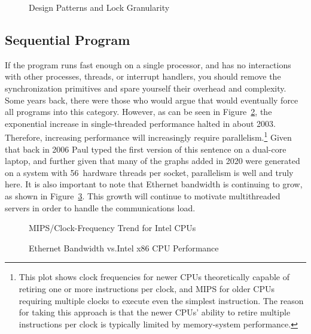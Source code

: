 \begin{figure}
\centering
{}
\caption{Design Patterns and Lock Granularity}
\label{fig:SMPdesign:Design Patterns and Lock Granularity}
\end{figure}

\subsection{Sequential Program}
\label{sec:SMPdesign:Sequential Program}

If the program runs fast enough on a single processor, and
has no interactions with other processes, threads, or interrupt
handlers, you should
remove the synchronization primitives and spare yourself their
overhead and complexity.
Some years back, there were those who would argue that 
would eventually force all programs into this category.
However, as can be seen in
Figure~\ref{fig:SMPdesign:Clock-Frequency Trend for Intel CPUs},
the exponential increase in single-threaded performance halted in
about 2003.
Therefore,
increasing performance will increasingly require parallelism.\footnote{
	This plot shows clock frequencies for newer CPUs theoretically
	capable of retiring one or more instructions per clock, and MIPS for
	older CPUs requiring multiple clocks to execute even the
	simplest instruction.
	The reason for taking this approach is that the newer CPUs'
	ability to retire multiple instructions per clock is typically
	limited by memory-system performance.}
Given that back in 2006 Paul typed the first version of this sentence
on a dual-core laptop, and further given that many of the graphs added
in 2020 were generated on a system with 56~hardware threads per socket,
parallelism is well and truly here.
It is also important to note that Ethernet bandwidth is continuing to
grow, as shown in
Figure~\ref{fig:SMPdesign:Ethernet Bandwidth vs. Intel x86 CPU Performance}.
This growth will continue to motivate multithreaded servers in order to
handle the communications load.

\begin{figure}
\centering
{}
\caption{MIPS/Clock-Frequency Trend for Intel CPUs}
\label{fig:SMPdesign:Clock-Frequency Trend for Intel CPUs}
\end{figure}

\begin{figure}
\centering
{}
\caption{Ethernet Bandwidth vs.\@ Intel x86 CPU Performance}
\label{fig:SMPdesign:Ethernet Bandwidth vs. Intel x86 CPU Performance}
\end{figure}

